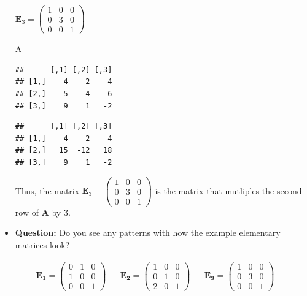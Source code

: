 \documentclass[
]{book}
\newenvironment{Shaded}{\begin{snugshade}}{\end{snugshade}}
\newcommand{\CommentTok}[1]{\textcolor[rgb]{0.56,0.35,0.01}{\textit{#1}}}
\newcommand{\DecValTok}[1]{\textcolor[rgb]{0.00,0.00,0.81}{#1}}
\newcommand{\NormalTok}[1]{#1}
\newcommand{\OperatorTok}[1]{\textcolor[rgb]{0.81,0.36,0.00}{\textbf{#1}}}
\newcommand{\StringTok}[1]{\textcolor[rgb]{0.31,0.60,0.02}{#1}}
\theoremstyle{definition}
\theoremstyle{definition}
\theoremstyle{definition}
\theoremstyle{remark}
\begin{document}
\begin{itemize}
  \(\mathbf{E}_3 = \begin{pmatrix} 1 & 0 & 0 \\ 0 & 3 & 0 \\ 0 & 0 & 1 \end{pmatrix}\)

\begin{Shaded}
\begin{Highlighting}[]
\NormalTok{A}
\end{Highlighting}
\end{Shaded}

\begin{verbatim}
##      [,1] [,2] [,3]
## [1,]    4   -2    4
## [2,]    5   -4    6
## [3,]    9    1   -2
\end{verbatim}

\begin{Shaded}
\end{Shaded}

\begin{verbatim}
##      [,1] [,2] [,3]
## [1,]    4   -2    4
## [2,]   15  -12   18
## [3,]    9    1   -2
\end{verbatim}

  Thus, the matrix \(\mathbf{E}_3 = \begin{pmatrix} 1 & 0 & 0 \\ 0 & 3 & 0 \\ 0 & 0 & 1 \end{pmatrix}\) is the matrix that mutliples the second row of \(\mathbf{A}\) by 3.
\item
  \textbf{Question:} Do you see any patterns with how the example elementary matrices look?
\end{itemize}

\[
\begin{aligned}
\mathbf{E_1} = \begin{pmatrix} 0 & 1 & 0 \\ 1 & 0 & 0 \\ 0 & 0 & 1 \end{pmatrix} && \mathbf{E_2} = \begin{pmatrix} 1 & 0 & 0 \\ 0 & 1 & 0 \\ 2 & 0 & 1 \end{pmatrix} && \mathbf{E_3} = \begin{pmatrix} 1 & 0 & 0 \\ 0 & 3 & 0 \\ 0 & 0 & 1 \end{pmatrix}
\end{aligned}
\]
\end{document}
